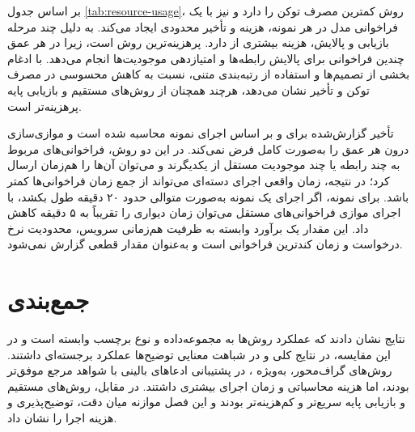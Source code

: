 بر اساس جدول \ref{tab:resource-usage}، روش  کمترین مصرف توکن را دارد و  نیز با یک فراخوانی مدل در هر نمونه، هزینه و تأخیر محدودی ایجاد می‌کند.  به دلیل چند مرحله بازیابی و پالایش، هزینه بیشتری از  دارد.  پرهزینه‌ترین روش است، زیرا در هر عمق چندین فراخوانی برای پالایش رابطه‌ها و امتیازدهی موجودیت‌ها انجام می‌دهد.  با ادغام بخشی از تصمیم‌ها و استفاده از رتبه‌بندی متنی، نسبت به  کاهش محسوسی در مصرف توکن و تأخیر نشان می‌دهد، هرچند همچنان از روش‌های مستقیم و بازیابی پایه پرهزینه‌تر است.

تأخیر گزارش‌شده برای  و  بر اساس اجرای نمونه محاسبه شده است و موازی‌سازی درون هر عمق را به‌صورت کامل فرض نمی‌کند. در این دو روش، فراخوانی‌های مربوط به چند رابطه یا چند موجودیت مستقل از یکدیگرند و می‌توان آن‌ها را هم‌زمان ارسال کرد؛ در نتیجه، زمان واقعی اجرای دسته‌ای می‌تواند از جمع زمان فراخوانی‌ها کمتر باشد. برای نمونه، اگر اجرای یک نمونه به‌صورت متوالی حدود ۲۰ دقیقه طول بکشد، با اجرای موازی فراخوانی‌های مستقل می‌توان زمان دیواری را تقریباً به ۵ دقیقه کاهش داد. این مقدار یک برآورد وابسته به ظرفیت هم‌زمانی سرویس، محدودیت نرخ درخواست و زمان کندترین فراخوانی است و به‌عنوان مقدار قطعی گزارش نمی‌شود.

\section{جمع‌بندی}

نتایج نشان دادند که عملکرد روش‌ها به مجموعه‌داده و نوع برچسب وابسته است و در این مقایسه،  در نتایج کلی و  در شباهت معنایی توضیح‌ها عملکرد برجسته‌ای داشتند. روش‌های گراف‌محور، به‌ویژه ، در پشتیبانی ادعاهای بالینی با شواهد مرجع موفق‌تر بودند، اما هزینه محاسباتی و زمان اجرای بیشتری داشتند. در مقابل، روش‌های مستقیم و بازیابی پایه سریع‌تر و کم‌هزینه‌تر بودند و این فصل موازنه میان دقت، توضیح‌پذیری و هزینه اجرا را نشان داد.
